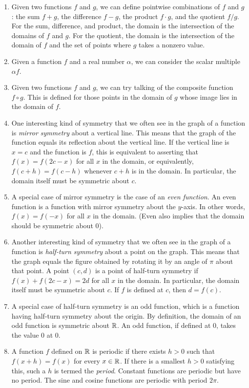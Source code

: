 \documentclass{amsart}
\begin{document}
\begin{enumerate}
\item Given two functions $f$ and $g$, we can define pointwise
  combinations of $f$ and $g$: the sum $f + g$, the difference $f -
  g$, the product $f \cdot g$, and the quotient $f/g$. For the sum,
  difference, and product, the domain is the intersection of the
  domains of $f$ and $g$. For the quotient, the domain is the
  intersection of the domain of $f$ and the set of points where $g$
  takes a nonzero value.
\item Given a function $f$ and a real number $\alpha$, we can consider
  the scalar multiple $\alpha f$.
\item Given two functions $f$ and $g$, we can try talking of the
  composite function $f \circ g$. This is defined for those points in
  the domain of $g$ whose image lies in the domain of $f$.
\item One interesting kind of symmetry that we often see in the graph
  of a function is {\em mirror symmetry} about a vertical line. This
  means that the graph of the function equals its reflection about the
  vertical line. If the vertical line is $x = c$ and the function is
  $f$, this is equivalent to asserting that $f(x) = f(2c - x)$ for all
  $x$ in the domain, or equivalently, $f(c + h) = f(c - h)$ whenever
  $c + h$ is in the domain. In particular, the domain itself must be
  symmetric about $c$.
\item A special case of mirror symmetry is the case of an {\em even
  function}. An even function is a function with mirror symmetry about
  the $y$-axis. In other words, $f(x) = f(-x)$ for all $x$ in the
  domain. (Even also implies that the domain should be symmetric about $0$).
\item Another interesting kind of symmetry that we often see in the
  graph of a function is {\em half-turn symmetry} about a point on the
  graph. This means that the graph equals the figure obtained by
  rotating it by an angle of $\pi$ about that point. A point $(c,d)$
  is a point of half-turn symmetry if $f(x) + f(2c - x) = 2d$ for all
  $x$ in the domain. In particular, the domain itself must be
  symmetric about $c$. If $f$ is defined at $c$, then $d = f(c)$.
\item A special case of half-turn symmetry is an odd function, which
  is a function having half-turn symmetry about the origin. By
  definition, the domain of an odd function is symmetric about $\mathbb{R}$. An
  odd function, if defined at $0$, takes the value $0$ at $0$.
\item A function $f$ defined on $\mathbb{R}$ is periodic if there exists $h >
  0$ such that $f(x+ h) = f(x)$ for every $x \in \mathbb{R}$. If there is a
  smallest $h > 0$ satisfying this, such a $h$ is termed the {\em
  period}. Constant functions are periodic but have no period. The
  sine and cosine functions are periodic with period $2\pi$.
\end{enumerate}
\end{document}
